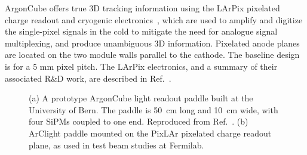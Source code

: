 ArgonCube offers true 3D tracking information using the LArPix pixelated charge readout and cryogenic electronics~\cite{larpix}, which are used to amplify and digitize the single-pixel signals in the cold to mitigate the need for analogue signal multiplexing, and produce unambiguous 3D information. Pixelated anode planes are located on the two module walls parallel to the cathode. The baseline design is for a 5 mm pixel pitch. The LArPix electronics, and a summary of their associated R\&D work, are described in Ref.~\cite{larpix}.

\begin{figure}[!ht]
	\centering
	\caption{(a) A prototype ArgonCube light readout paddle built at the University of Bern. The paddle is 50~cm long and 10~cm wide, with four SiPMs coupled to one end. Reproduced from Ref.~\cite{argoncube_loi}. (b) ArClight paddle mounted on the PixLAr pixelated charge readout plane, as used in test beam studies at Fermilab.}
	\label{fig:arclight}
\end{figure}


